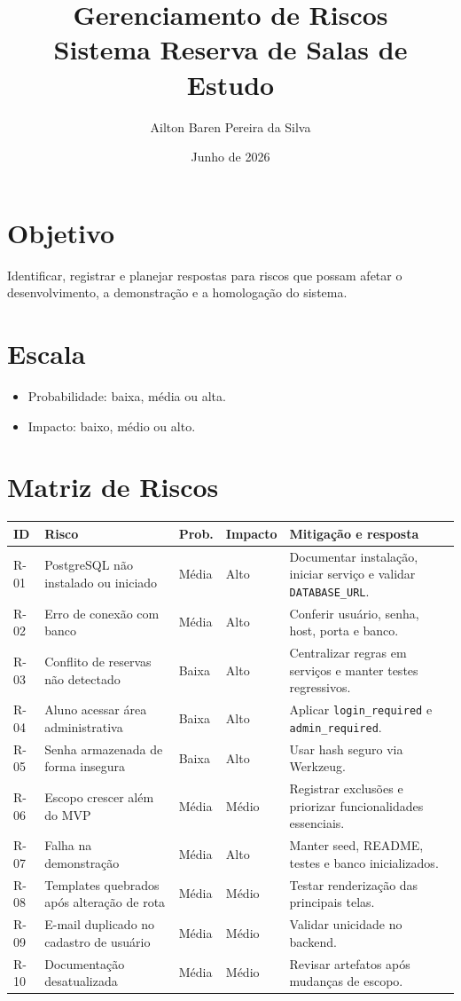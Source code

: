 \documentclass[12pt,a4paper]{article}
\title{\textbf{Gerenciamento de Riscos}\\Sistema Reserva de Salas de Estudo}
\author{Ailton Baren Pereira da Silva}
\date{Junho de 2026}
\begin{document}
\maketitle

\section{Objetivo}
Identificar, registrar e planejar respostas para riscos que possam afetar o desenvolvimento, a demonstração e a homologação do sistema.

\section{Escala}
\begin{itemize}
    \item Probabilidade: baixa, média ou alta.
    \item Impacto: baixo, médio ou alto.
\end{itemize}

\section{Matriz de Riscos}
\begin{longtable}{|p{1.2cm}|p{4cm}|p{2cm}|p{1.8cm}|p{5cm}|}
\hline
\textbf{ID} & \textbf{Risco} & \textbf{Prob.} & \textbf{Impacto} & \textbf{Mitigação e resposta} \\ \hline
R-01 & PostgreSQL não instalado ou iniciado & Média & Alto & Documentar instalação, iniciar serviço e validar \texttt{DATABASE\_URL}. \\ \hline
R-02 & Erro de conexão com banco & Média & Alto & Conferir usuário, senha, host, porta e banco. \\ \hline
R-03 & Conflito de reservas não detectado & Baixa & Alto & Centralizar regras em serviços e manter testes regressivos. \\ \hline
R-04 & Aluno acessar área administrativa & Baixa & Alto & Aplicar \texttt{login\_required} e \texttt{admin\_required}. \\ \hline
R-05 & Senha armazenada de forma insegura & Baixa & Alto & Usar hash seguro via Werkzeug. \\ \hline
R-06 & Escopo crescer além do MVP & Média & Médio & Registrar exclusões e priorizar funcionalidades essenciais. \\ \hline
R-07 & Falha na demonstração & Média & Alto & Manter seed, README, testes e banco inicializados. \\ \hline
R-08 & Templates quebrados após alteração de rota & Média & Médio & Testar renderização das principais telas. \\ \hline
R-09 & E-mail duplicado no cadastro de usuário & Média & Médio & Validar unicidade no backend. \\ \hline
R-10 & Documentação desatualizada & Média & Médio & Revisar artefatos após mudanças de escopo. \\ \hline
\end{longtable}
\end{document}
